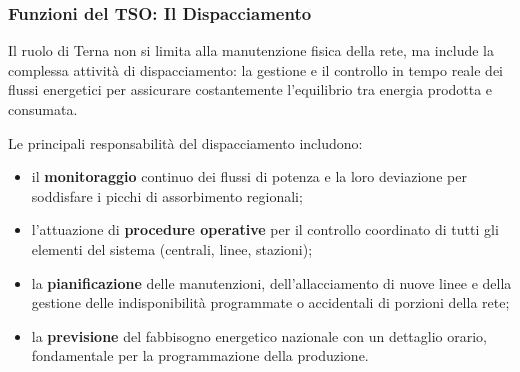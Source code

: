 \subsubsection{Funzioni del TSO: Il Dispacciamento}

Il ruolo di Terna non si limita alla manutenzione fisica della rete, ma include la complessa attività di dispacciamento: la gestione e il controllo in tempo reale dei flussi energetici per assicurare costantemente l'equilibrio tra energia prodotta e consumata. 

Le principali responsabilità del dispacciamento includono:

\begin{itemize}
    \item il \textbf{monitoraggio} continuo dei flussi di potenza e la loro deviazione per soddisfare i picchi di assorbimento regionali;
    \item l'attuazione di \textbf{procedure operative} per il controllo coordinato di tutti gli elementi del sistema (centrali, linee, stazioni);
    \item la \textbf{pianificazione} delle manutenzioni, dell'allacciamento di nuove linee e della gestione delle indisponibilità programmate o accidentali di porzioni della rete;
    \item la \textbf{previsione} del fabbisogno energetico nazionale con un dettaglio orario, fondamentale per la programmazione della produzione.
\end{itemize}








